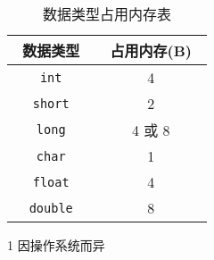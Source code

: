     \begin{table}[htbp]
        \centering
        \renewcommand\arraystretch{1.5}
        \begin{threeparttable}
            \begin{tabular}{|c|c|} 
                \hline
                ~数据类型~    & ~占用内存(B)~   \\
                \hline \hline
                \texttt{int}         & 4             \\
                \hline
                \texttt{short}       & 2             \\
                \hline
                \texttt{long}        & 4 或 8\tnote{1} \\
                \hline
                \texttt{char}        & 1             \\
                \hline
                \texttt{float}       & 4             \\
                \hline
                \texttt{double}      & 8             \\
                \hline
            \end{tabular} 
            \begin{tablenotes}
                \item[1] 因操作系统而异
            \end{tablenotes}
            \caption{数据类型占用内存表} \label{数据类型占用内存表}
        \end{threeparttable}
    \end{table} 

